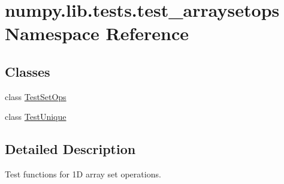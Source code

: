 \hypertarget{namespacenumpy_1_1lib_1_1tests_1_1test__arraysetops}{}\section{numpy.\+lib.\+tests.\+test\+\_\+arraysetops Namespace Reference}
\label{namespacenumpy_1_1lib_1_1tests_1_1test__arraysetops}
\subsection*{Classes}
\begin{DoxyCompactItemize}
\item 
class \hyperlink{classnumpy_1_1lib_1_1tests_1_1test__arraysetops_1_1TestSetOps}{Test\+Set\+Ops}
\item 
class \hyperlink{classnumpy_1_1lib_1_1tests_1_1test__arraysetops_1_1TestUnique}{Test\+Unique}
\end{DoxyCompactItemize}


\subsection{Detailed Description}
\begin{DoxyVerb}Test functions for 1D array set operations.\end{DoxyVerb}
 